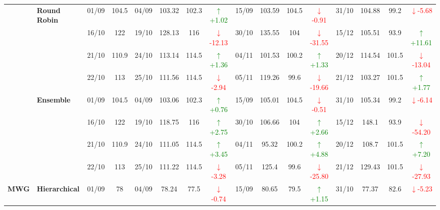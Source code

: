 {\begin{longtable}{llcc|cccc|cccc|cccc}
& \textbf{Round Robin}
& 01/09 & 104.5 & 04/09 & 103.32 & 102.3 & \textcolor{green}{\(\uparrow\)+1.02} & 15/09 & 103.59 & 104.5 & \textcolor{red}{\(\downarrow\)-0.91} & 31/10 & 104.88 & 99.2 & \textcolor{red}{\(\downarrow\)-5.68} \\

&
& 16/10 & 122 & 19/10 & 128.13 & 116 & \textcolor{red}{\(\downarrow\)-12.13} & 30/10 & 135.55 & 104 & \textcolor{red}{\(\downarrow\)-31.55} & 15/12 & 105.51 & 93.9 & \textcolor{green}{\(\uparrow\)+11.61} \\

&
& 21/10 & 110.9 & 24/10 & 113.14 & 114.5 & \textcolor{green}{\(\uparrow\)+1.36} & 04/11 & 101.53 & 100.2 & \textcolor{green}{\(\uparrow\)+1.33} & 20/12 & 114.54 & 101.5 & \textcolor{red}{\(\downarrow\)-13.04} \\

&
& 22/10 & 113 & 25/10 & 111.56 & 114.5 & \textcolor{red}{\(\downarrow\)-2.94} & 05/11 & 119.26 & 99.6 & \textcolor{red}{\(\downarrow\)-19.66} & 21/12 & 103.27 & 101.5 & \textcolor{green}{\(\uparrow\)+1.77} \\
\cmidrule(lr){2-16}


& \textbf{Ensemble}
& 01/09 & 104.5 & 04/09 & 103.06 & 102.3 & \textcolor{green}{\(\uparrow\)+0.76} & 15/09 & 105.01 & 104.5 & \textcolor{red}{\(\downarrow\)-0.51} & 31/10 & 105.34 & 99.2 & \textcolor{red}{\(\downarrow\)-6.14} \\

&
& 16/10 & 122 & 19/10 & 118.75 & 116 & \textcolor{green}{\(\uparrow\)+2.75} & 30/10 & 106.66 & 104 & \textcolor{green}{\(\uparrow\)+2.66} & 15/12 & 148.1 & 93.9 & \textcolor{red}{\(\downarrow\)-54.20} \\

&
& 21/10 & 110.9 & 24/10 & 111.05 & 114.5 & \textcolor{green}{\(\uparrow\)+3.45} & 04/11 & 95.32 & 100.2 & \textcolor{green}{\(\uparrow\)+4.88} & 20/12 & 108.7 & 101.5 & \textcolor{green}{\(\uparrow\)+7.20} \\

&
& 22/10 & 113 & 25/10 & 111.22 & 114.5 & \textcolor{red}{\(\downarrow\)-3.28} & 05/11 & 125.4 & 99.6 & \textcolor{red}{\(\downarrow\)-25.80} & 21/12 & 129.43 & 101.5 & \textcolor{red}{\(\downarrow\)-27.93} \\
\midrule




\multirow{12}{*}{\textbf{MWG}} 
& \textbf{Hierarchical}
& 01/09 & 78 & 04/09 & 78.24 & 77.5 & \textcolor{red}{\(\downarrow\)-0.74} & 15/09 & 80.65 & 79.5 & \textcolor{green}{\(\uparrow\)+1.15} & 31/10 & 77.37 & 82.6 & \textcolor{red}{\(\downarrow\)-5.23} \\


\end{longtable}}
